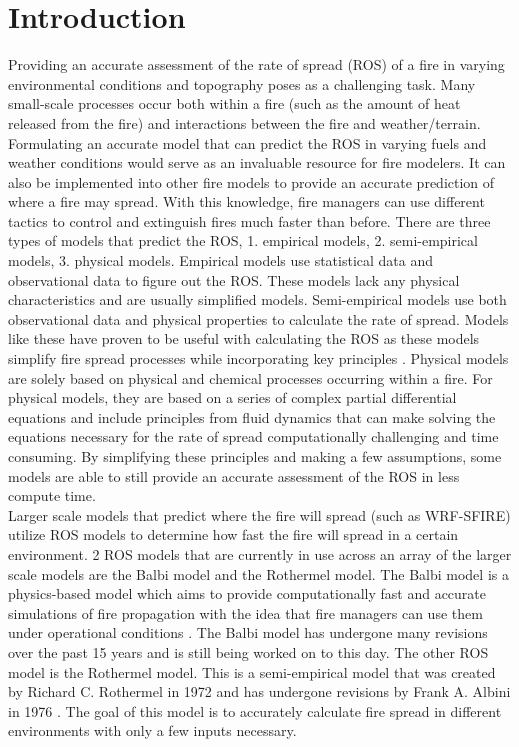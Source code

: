 \documentclass{article}
\begin{document}
\section{Introduction}
Providing an accurate assessment of the rate of spread (ROS) of a fire in varying environmental conditions and topography poses as a challenging task. Many small-scale processes occur both within a fire (such as the amount of heat released from the fire) and interactions between the fire and weather/terrain. Formulating an accurate model that can predict the ROS in varying fuels and weather conditions would serve as an invaluable resource for fire modelers. It can also be implemented into other fire models to provide an accurate prediction of where a fire may spread. With this knowledge, fire managers can use different tactics to control and extinguish fires much faster than before. There are three types of models that predict the ROS, 1. empirical models, 2. semi-empirical models, 3. physical models. Empirical models use statistical data and observational data to figure out the ROS. These models lack any physical characteristics and are usually simplified models. Semi-empirical models use both observational data and physical properties to calculate the rate of spread. Models like these have proven to be useful with calculating the ROS as these models simplify fire spread processes while incorporating key principles \cite{Chatelon2022}. Physical models are solely based on physical and chemical processes occurring within a fire. For physical models, they are based on a series of complex partial differential equations and include principles from fluid dynamics that can make solving the equations necessary for the rate of spread computationally challenging and time consuming. By simplifying these principles and making a few assumptions, some models are able to still provide an accurate assessment of the ROS in less compute time. \\
\indent Larger scale models that predict where the fire will spread (such as WRF-SFIRE) utilize ROS models to determine how fast the fire will spread in a certain environment. 2 ROS models that are currently in use across an array of the larger scale models are the Balbi model and the Rothermel model. The Balbi model is a physics-based model which aims to provide computationally fast and accurate simulations of fire propagation with the idea that fire managers can use them under operational conditions \cite{Chatelon2022}. The Balbi model has undergone many revisions over the past 15 years and is still being worked on to this day. The other ROS model is the Rothermel model. This is a semi-empirical model that was created by Richard C. Rothermel in 1972 and has undergone revisions by Frank A. Albini in 1976 \cite{Anderson2010}. The goal of this model is to accurately calculate fire spread in different environments with only a few inputs necessary.\\
\end{document}
